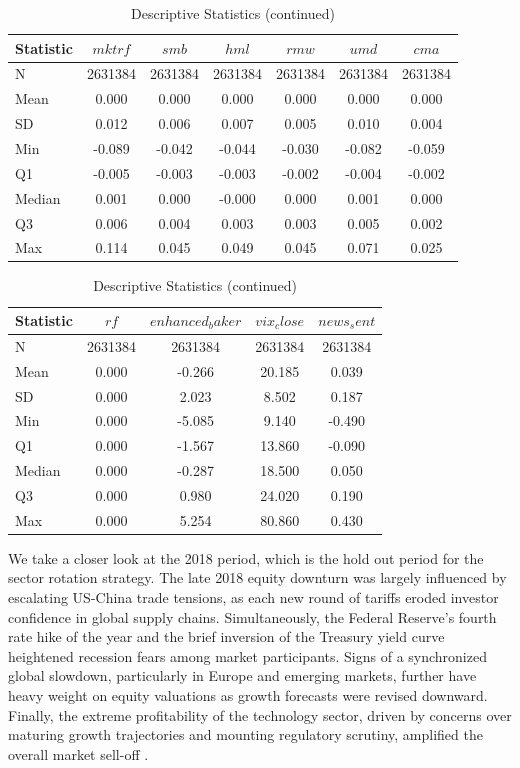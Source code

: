 \begin{table}[ht]
\centering
\caption{Descriptive Statistics (continued)}
\label{tab:descr_stats2}
\begin{tabular}{lcccccc}
\toprule
Statistic & $mktrf$ & $smb$ & $hml$ & $rmw$ & $umd$ & $cma$ \\\midrule
N & 2631384 & 2631384 & 2631384 & 2631384 & 2631384 & 2631384 \\
Mean & 0.000 & 0.000 & 0.000 & 0.000 & 0.000 & 0.000 \\
SD & 0.012 & 0.006 & 0.007 & 0.005 & 0.010 & 0.004 \\
Min & -0.089 & -0.042 & -0.044 & -0.030 & -0.082 & -0.059 \\
Q1 & -0.005 & -0.003 & -0.003 & -0.002 & -0.004 & -0.002 \\
Median & 0.001 & 0.000 & -0.000 & 0.000 & 0.001 & 0.000 \\
Q3 & 0.006 & 0.004 & 0.003 & 0.003 & 0.005 & 0.002 \\
Max & 0.114 & 0.045 & 0.049 & 0.045 & 0.071 & 0.025 \\
\bottomrule
\end{tabular}
\end{table}

\begin{table}[ht]
\centering
\caption{Descriptive Statistics (continued)}
\label{tab:descr_stats3}

\begin{tabular}{lcccc}
\toprule
Statistic & $rf$ & $enhanced_baker$ & $vix_close$ & $news_sent$ \\\midrule
N & 2631384 & 2631384 & 2631384 & 2631384 \\
Mean & 0.000 & -0.266 & 20.185 & 0.039 \\
SD & 0.000 & 2.023 & 8.502 & 0.187 \\
Min & 0.000 & -5.085 & 9.140 & -0.490 \\
Q1 & 0.000 & -1.567 & 13.860 & -0.090 \\
Median & 0.000 & -0.287 & 18.500 & 0.050 \\
Q3 & 0.000 & 0.980 & 24.020 & 0.190 \\
Max & 0.000 & 5.254 & 80.860 & 0.430 \\
\bottomrule
\end{tabular}
\end{table}

We take a closer look at the 2018 period, which is the hold out period for the sector rotation strategy. The late 2018 equity downturn was largely influenced by escalating US-China trade tensions, as each new round of tariffs eroded investor confidence in global supply chains. Simultaneously, the Federal Reserve's fourth rate hike of the year and the brief inversion of the Treasury yield curve heightened recession fears among market participants. Signs of a synchronized global slowdown, particularly in Europe and emerging markets, further have heavy weight on equity valuations as growth forecasts were revised downward. Finally, the extreme profitability of the technology sector, driven by concerns over maturing growth trajectories and mounting regulatory scrutiny, amplified the overall market sell-off \cite{reuters_2018}.

